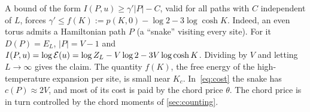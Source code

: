 \begin{remark}\label{rem:hamilton}
A bound of the form $I(P,u)\ge\gamma'|P|-C$, valid for all paths with $C$ independent of $L$, forces $\gamma'\le f(K):=p(K,0)-\log2-3\log\cosh K$. Indeed, an even torus admits a Hamiltonian path $P$ (a ``snake'' visiting every site). For it $D(P)=E_L$, $|P|=V-1$ and $I(P,u)=\log\mathcal E(u)=\log Z_L-V\log2-3V\log\cosh K$. Dividing by $V$ and letting $L\to\infty$ gives the claim. The quantity $f(K)$, the free energy of the high-temperature expansion per site, is small near $K_c$. In~\eqref{eq:cost} the snake has $c(P)\approx2V$, and most of its cost is paid by the chord price $\theta$. The chord price is in turn controlled by the chord moments of \cref{sec:counting}.
\end{remark}
